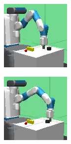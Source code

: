 \begin{figure}
    \centering
    \begin{subfigure}[b]{.19\textwidth}
    \centering
    \includegraphics[width=\textwidth]{images/results/push-barrier-drq/frames/frame_0.png}
    \end{subfigure}
    \begin{subfigure}[b]{.19\textwidth}
    \centering
    \includegraphics[width=\textwidth]{images/results/push-barrier-drq/frames/frame_1.png}

\end{subfigure}
\end{figure}
